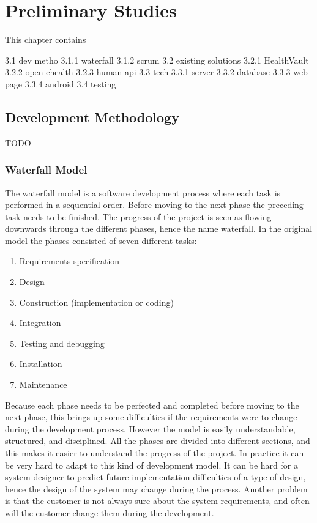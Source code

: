 \chapter{Preliminary Studies}
\label{Preliminary Studies}

This chapter contains

3.1 dev metho
3.1.1 waterfall
3.1.2 scrum
3.2 existing solutions
3.2.1 HealthVault
3.2.2 open ehealth
3.2.3 human api
3.3 tech
3.3.1 server
3.3.2 database
3.3.3 web page
3.3.4 android
3.4 testing



\section{Development Methodology}

TODO

\subsection{Waterfall Model}

The waterfall model is a software development process where each task is performed in a sequential order.
Before moving to the next phase the preceding task needs to be finished.
The progress of the project is seen as flowing downwards through the different phases, hence the name waterfall.
In the original model the phases consisted of seven different tasks:

\begin{enumerate}
\item Requirements specification
\item Design
\item Construction (implementation or coding)
\item Integration
\item Testing and debugging
\item Installation
\item Maintenance
\end{enumerate}

Because each phase needs to be perfected and completed before moving to the next phase, this brings up some difficulties if the requirements were to change during the development process. 
However the model is easily understandable, structured, and disciplined. 
All the phases are divided into different sections, and this makes it easier to understand the progress of the project.
In practice it can be very hard to adapt to this kind of development model. 
It can be hard for a system designer to predict future implementation difficulties of a type of design, hence the design of the system may change during the process.
Another problem is that the customer is not always sure about the system requirements, and often will the customer change them during the development.

